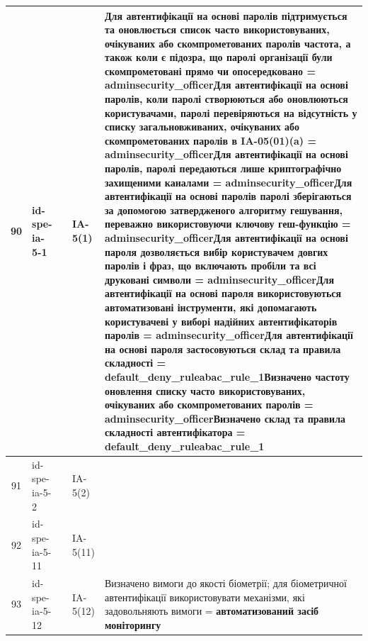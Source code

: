 \documentclass[10pt]{article}
\begin{document}
\begin{longtable}{|c|>{\raggedright\arraybackslash}p{2.5cm}|>{\raggedright\arraybackslash}p{4.5cm}|>{\raggedright\arraybackslash}p{3cm}|>{\raggedright\arraybackslash}p{4.5cm}|}
90 & id-spe-ia-5-1 &  & IA-5(1) & Для автентифікації на основі паролів підтримується та оновлюється список часто використовуваних, очікуваних або скомпрометованих паролів частота, а також коли є підозра, що паролі організації були скомпрометовані прямо чи опосередковано = \textbf{adminsecurity\_\allowbreak{}officer}\newline Для автентифікації на основі паролів, коли паролі створюються або оновлюються користувачами, паролі перевіряються на відсутність у списку загальновживаних, очікуваних або скомпрометованих паролів в IA-05(01)(a) = \textbf{adminsecurity\_\allowbreak{}officer}\newline Для автентифікації на основі паролів, паролі передаються лише криптографічно захищеними каналами = \textbf{adminsecurity\_\allowbreak{}officer}\newline Для автентифікації на основі паролів паролі зберігаються за допомогою затвердженого алгоритму гешування, переважно використовуючи ключову геш-функцію = \textbf{adminsecurity\_\allowbreak{}officer}\newline Для автентифікації на основі пароля дозволяється вибір користувачем довгих паролів і фраз, що включають пробіли та всі друковані символи = \textbf{adminsecurity\_\allowbreak{}officer}\newline Для автентифікації на основі пароля використовуються автоматизовані інструменти, які допомагають користувачеві у виборі надійних автентифікаторів паролів = \textbf{adminsecurity\_\allowbreak{}officer}\newline Для автентифікації на основі пароля застосовуються склад та правила складності = \textbf{default\_\allowbreak{}deny\_\allowbreak{}ruleabac\_\allowbreak{}rule\_\allowbreak{}1}\newline Визначено частоту оновлення списку часто використовуваних, очікуваних або скомпрометованих паролів = \textbf{adminsecurity\_\allowbreak{}officer}\newline Визначено склад та правила складності автентифікатора = \textbf{default\_\allowbreak{}deny\_\allowbreak{}ruleabac\_\allowbreak{}rule\_\allowbreak{}1} \\ \hline
91 & id-spe-ia-5-2 &  & IA-5(2) &  \\ \hline
92 & id-spe-ia-5-11 &  & IA-5(11) &  \\ \hline
93 & id-spe-ia-5-12 &  & IA-5(12) & Визначено вимоги до якості біометрії; для біометричної автентифікації використовувати механізми, які задовольняють вимоги = \textbf{автоматизований засіб моніторингу} \\ \hline

\end{longtable}
\end{document}
